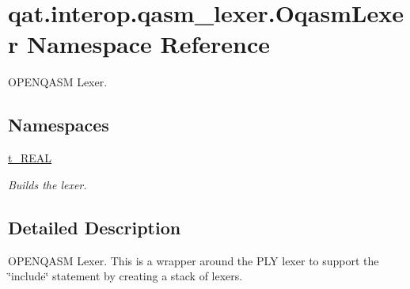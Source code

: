 \hypertarget{namespaceqat_1_1interop_1_1qasm__lexer_1_1OqasmLexer}{\section{qat.\-interop.\-qasm\-\_\-lexer.\-Oqasm\-Lexer Namespace Reference}
\label{namespaceqat_1_1interop_1_1qasm__lexer_1_1OqasmLexer}
}


O\-P\-E\-N\-Q\-A\-S\-M Lexer.  


\subsection*{Namespaces}
\begin{DoxyCompactItemize}
\item 
\hyperlink{namespaceqat_1_1interop_1_1qasm__lexer_1_1OqasmLexer_1_1t__REAL}{t\-\_\-\-R\-E\-A\-L}
\begin{DoxyCompactList}\small\item\em Builds the lexer. \end{DoxyCompactList}\end{DoxyCompactItemize}


\subsection{Detailed Description}
O\-P\-E\-N\-Q\-A\-S\-M Lexer. This is a wrapper around the P\-L\-Y lexer to support the \char`\"{}include\char`\"{} statement by creating a stack of lexers. 